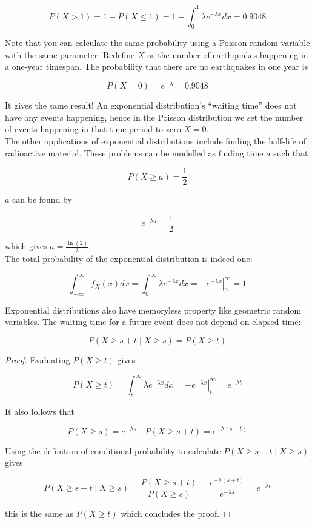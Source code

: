 \documentclass[12pt, a4paper]{article}
\begin{document}
$$P(X>1)=1-P(X\le1)=1-\int_0^1\lambda e^{-\lambda x}dx=0.9048$$

Note that you can calculate the same probability using a Poisson random variable with the same parameter. Redefine $X$ as the number of earthquakes happening in a one-year timespan. The probability that there are no earthquakes in one year is

$$P(X=0)=e^{-\lambda}=0.9048$$

It gives the same result! An exponential distribution's ``waiting time'' does not have any events happening, hence in the Poisson distribution we set the number of events happening in that time period to zero $X=0$. \\

The other applications of exponential distributions include finding the half-life of radioactive material. These problems can be modelled as finding time $a$ such that

$$P(X\ge a)=\frac12$$

$a$ can be found by

$$e^{-\lambda a}=\frac12$$

which gives $a=\frac{\ln(2)}{\lambda}$. \\

The total probability of the exponential distribution is indeed one:

$$\int_{-\infty}^\infty f_X(x) dx = \int_0^\infty \lambda e^{-\lambda x} dx = \left. -e^{-\lambda x} \right\vert_0^\infty = 1$$

Exponential distributions also have memoryless property like geometric random variables. The waiting time for a future event does not depend on elapsed time:

$$P(X\ge s+t \mid X\ge s)=P(X\ge t)$$

\begin{proof}
Evaluating $P(X\ge t)$ gives

$$P(X\ge t)=\int_t^\infty \lambda e^{-\lambda x} dx = \left. -e^{-\lambda x} \right\vert_t^\infty = e^{-\lambda t}$$

It also follows that

$$P(X\ge s)=e^{-\lambda s} \quad P(X\ge s+t)=e^{-\lambda (s+t)}$$

Using the definition of conditional probability to calculate $P(X\ge s+t \mid X\ge s)$ gives

$$P(X\ge s+t \mid X\ge s)=\frac{P(X\ge s+t)}{P(X\ge s)}=\frac{e^{-\lambda (s+t)}}{e^{-\lambda s}}=e^{-\lambda t}$$

this is the same as $P(X\ge t)$ which concludes the proof.
\end{proof}
\end{document}
